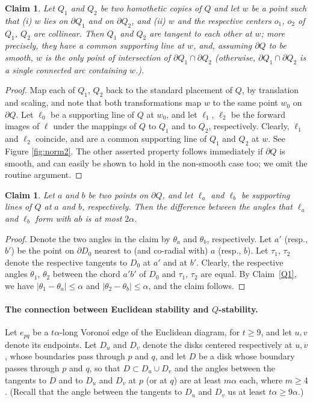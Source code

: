 \documentclass[letter,11pt]{article}
\newtheorem{claim}[theorem]{Claim}
\def\bd{{\partial}}
\begin{document}
\begin{claim} \label{Q2}
Let $Q_1$ and $Q_2$ be two homothetic copies of $Q$ and let $w$ be a
point such that (i) $w$ lies on $\bd Q_1$ and on $\bd Q_2$, and
(ii) $w$ and the respective centers $o_1$, $o_2$ of $Q_1$, $Q_2$
are collinear. Then $Q_1$ and $Q_2$ are tangent to each other at $w$;
more precisely, they have a common supporting line at $w$, and, assuming $\partial Q$ to be smooth, $w$ is the only point of intersection of $\partial Q_1\cap \partial Q_2$ (otherwise, $\partial Q_1\cap \partial Q_2$ is a single connected arc containing $w$.).
\end{claim}
\begin{proof}
Map each of $Q_1$, $Q_2$ back to the standard placement of $Q$, by
translation and scaling, and note that both transformations map $w$
to the same point $w_0$ on $\bd Q$. Let $\ell_0$ be a supporting line
of $Q$ at $w_0$, and let $\ell_1$, $\ell_2$ be the forward images of
$\ell$ under the mappings of $Q$ to $Q_1$ and to $Q_2$, respectively.
Clearly, $\ell_1$ and $\ell_2$ coincide, and are a common supporting
line of $Q_1$ and $Q_2$ at $w$.
See Figure \ref{fig:norm2}. The other asserted property follows immediately if $\partial Q$ is smooth, and can easily be shown to hold in the non-smooth case too; we omit the routine argument.
\end{proof}

\begin{claim} \label{Q3}
Let $a$ and $b$ be two points on $\bd Q$, and let $\ell_a$ and $\ell_b$
be supporting lines of $Q$ at $a$ and $b$, respectively. Then the
difference between the angles that $\ell_a$ and $\ell_b$ form with
$ab$ is at most $2\alpha$.
\end{claim}

\begin{proof}
Denote the two angles in the claim by $\theta_a$ and $\theta_b$,
respectively.
Let $a'$ (resp., $b'$) be the point on $\bd D_0$ nearest to (and
co-radial with) $a$ (resp., $b$). Let $\tau_1$, $\tau_2$ denote the
respective tangents to $D_0$ at $a'$ and at $b'$.  Clearly, the 
respective angles $\theta_1$, $\theta_2$ between the chord $a'b'$ 
of $D_0$ and $\tau_1$, $\tau_2$ are equal. By Claim~\ref{Q1}, we 
have $|\theta_1-\theta_a|\le\alpha$ and
$|\theta_2-\theta_b|\le\alpha$, and the claim follows.
\end{proof}

\paragraph{The connection between Euclidean stability and $Q$-stability.} 
Let $e_{pq}$ be a $t\alpha$-long Voronoi edge of the Euclidean diagram, for $t\ge 9$, 
and let $u,v$ denote its endpoints. 
Let $D_u$ and $D_v$ denote the disks centered respectively
at $u,v$, whose boundaries pass through $p$ and $q$, and let $D$ be a
disk whose boundary passes through $p$ and $q$, so that 
$D\subset D_u\cup D_v$ and the angles between the tangents to $D$ and
to $D_u$ and $D_v$ at $p$ (or at $q$) are at least $m\alpha$ each, where
$m \geq 4$. (Recall that the angle between the tangents to $D_u$ and $D_v$ us at least $t\alpha\geq 9\alpha$.)
\end{document}
